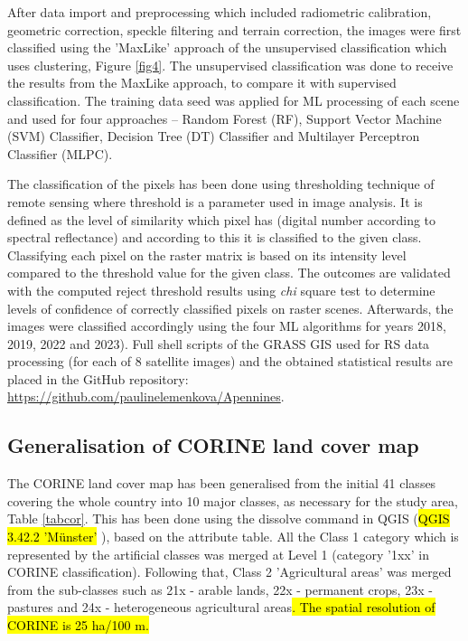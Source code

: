 \documentclass[jimaging,article,submit,pdftex,moreauthors]{Definitions/mdpi}
\begin{document}
After data import and preprocessing which included radiometric calibration, geometric correction, speckle filtering and terrain correction, the images were first classified using the 'MaxLike' approach of the unsupervised classification which uses clustering, Figure \ref{fig4}. The unsupervised classification was done to receive the results from the MaxLike approach, to compare it with supervised classification. The training data seed was applied for ML processing of each scene and used for four approaches -- Random Forest (RF), Support Vector Machine (SVM) Classifier, Decision Tree (DT) Classifier and Multilayer Perceptron Classifier (MLPC).

The classification of the pixels has been done using thresholding technique of remote sensing where threshold is a parameter used in image analysis. It is defined as the level of similarity which pixel has (digital number according to spectral reflectance) and according to this it is classified to the given class. Classifying each pixel on the raster matrix is based on its intensity level compared to the threshold value for the given class. The outcomes are validated with the computed reject threshold results using \emph{chi} square test to determine levels of confidence of correctly classified pixels on raster scenes. Afterwards, the images were classified accordingly {using the four ML algorithms for years} {2018}, 2019, 2022 and 2023{). }Full shell scripts of the GRASS GIS used for RS data processing (for each of 8 satellite images) and the obtained statistical results are placed in the GitHub repository: \href{https://github.com/paulinelemenkova/Apennines}{https://github.com/paulinelemenkova/Apennines}.

\subsection{{Generalisation of CORINE land cover map}}

The {CORINE land cover map} has been generalised from the initial 41 classes covering the whole country into 10 major classes, as necessary for the study area{, Table} \ref{tabcor}. {This has been done using the dissolve command in QGIS (\hl{QGIS 3.42.2 'M\"unster'} ), based on the attribute table}. {All} the Class 1 category which is represented by the artificial classes was merged at Level 1 (category '1xx' in CORINE classification{)}.{ }Following that, Class 2 'Agricultural areas' was merged from the sub-classes such as 21x - arable lands, 22x - permanent crops, 23x - pastures and 24x - heterogeneous agricultural areas\hl{. The spatial resolution of CORINE is 25 ha/100 m.}
\end{document}
